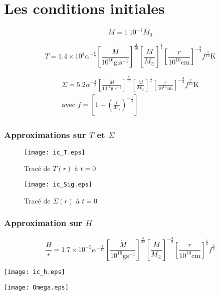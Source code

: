 \section{Les conditions initiales}
\begin{frame}
	\begin{equation*}
	\dot{M} = 1\ 10^{-1 }\dot{M_{0}}
\end{equation*} 

\begin{equation*}
	T = 1.4 \times 10^{4} \alpha^{- \frac{1}{5}} \left[ \frac{\dot{M}}{10^{16} \mathrm{g.s}^{-1}} \right]^{\frac{3}{10}} \left[ \frac{M}{M_\odot}\right]^{\frac{1}{4}} \left[ \frac{r}{10^{10}\mathrm{cm}}\right]^{- \frac{3}{4}} f^{\frac{3}{10}} \mathrm{K} 
\end{equation*}

\begin{align}
	\Sigma = 5.2 \alpha^{- \frac{4}{5}} \left[ \frac{\dot{M}}{10^{16} \mathrm{g.s}^{-1}} \right]^{\frac{7}{10}} \left[ \frac{M}{M_\odot}\right]^{\frac{1}{4}} \left[ \frac{r}{10^{10} \mathrm{cm}}\right]^{- \frac{3}{4}} f^{\frac{7}{10}} \mbox{K}  \\ 
	\text{avec } f = \left[ 1 - \left( \frac{r}{3 r_{s}}\right)^{- \frac{1}{2}}\right]
\end{align}
\end{frame}

\begin{frame}
\frametitle{Approximations sur $T$ et $\Sigma$}
 \begin{figure}[ht]
   \begin{minipage}[c]{.46\linewidth}
      \texttt{[image: ic\_T.eps]}
      \caption{Tracé de $T(r)$ à $t = 0$}
   \end{minipage} \hfill
   \begin{minipage}[c]{.46\linewidth}
      \texttt{[image: ic\_Sig.eps]}
      \caption{Tracé de $\Sigma(r)$ à $t = 0$}
   \end{minipage}
\end{figure} 
\end{frame}

\begin{frame}
\frametitle{Approximation sur $H$}
	\begin{equation*}
	\frac{H}{r} = 1.7 \times 10^{-2}\alpha^{- \frac{1}{10}} \left[ \frac{\dot{M}}{10^{16} \mbox{g} \mbox{s}^{-1}} \right]^{\frac{3}{20}} \left[ \frac{M}{M_\odot}\right]^{- \frac{3}{8}} \left[ \frac{r}{10^{10} \mathrm{cm}}\right]^{\frac{1}{8}} f^{\frac{3}{5}}
\end{equation*}
\end{frame}

\begin{frame}
	\begin{center}
		\texttt{[image: ic\_h.eps]}
	\end{center}
\end{frame}

\begin{frame}
	\begin{center}
		\texttt{[image: Omega.eps]}
	\end{center}
\end{frame}